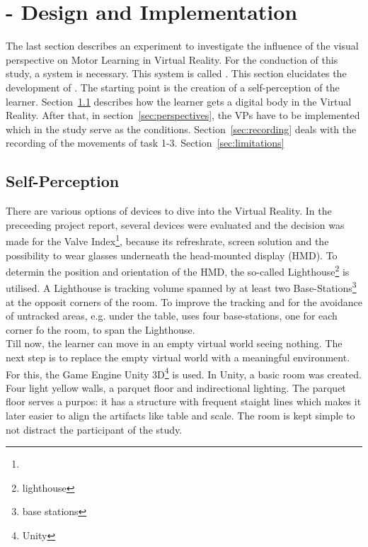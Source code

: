\section{\exgo - Design and Implementation}
\label{section:system}
The last section describes an experiment to investigate the influence of the visual perspective on Motor Learning in Virtual Reality. For the conduction of this study, a system is necessary. This system is called \exgo. This section elucidates the development of \exgo. The starting point is the creation of a self-perception of the learner. Section~\ref{sec:selfperception} describes how the learner gets a digital body in the Virtual Reality. After that, in section~\ref{sec:perspectives}, the VPs have to be implemented which in the study serve as the conditions. Section~\ref{sec:recording} deals with the recording of the movements of task 1-3. Section~\ref{sec:limitations}

\subsection{Self-Perception}
\label{sec:selfperception}
There are various options of devices to dive into the Virtual Reality. In the preceeding project report, several devices were evaluated and the decision was made for the Valve Index\footnote{}, because its refreshrate, screen solution and the possibility to wear glasses underneath the head-mounted display (HMD). To determin the position and orientation of the HMD, the so-called Lighthouse\footnote{lighthouse} is utilised. A Lighthouse is tracking volume spanned by at least two Base-Stations\footnote{base stations} at the opposit corners of the room. To improve the tracking and for the avoidance of untracked areas, e.g. under the table, \exgo uses four base-stations, one for each corner fo the room, to span the Lighthouse.\\

Till now, the learner can move in an empty virtual world seeing nothing. The next step is to replace the empty virtual world with a meaningful environment. For this, the Game Engine Unity 3D\footnote{Unity} is used. In Unity, a basic room was created. Four light yellow walls, a parquet floor and indirectional lighting. The parquet floor serves a purpos: it has a structure with frequent staight lines which makes it later easier to align the artifacts like table and scale. The room is kept simple to not distract the participant of the study.\\

